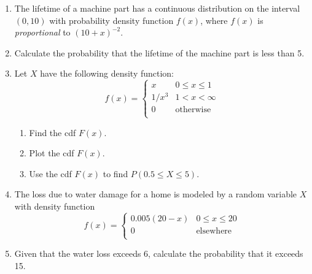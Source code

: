 \documentclass{article}
\begin{document}
\begin{enumerate}
    \item The lifetime of a machine part has a continuous distribution on the interval $(0,10)$ with probability density function $f(x)$, where $f(x)$ is \textit{proportional} to $(10 +x)^{-2}$.
    \item[] Calculate the probability that the lifetime of the machine part is less than 5.\bigskip%
    
    \item Let $X$ have the following density function:%
    \[
    f(x) =
        \left\{
        \begin{array}{ll}
             x & 0 \le x \le 1\\
             1/x^3 & 1 < x < \infty\\
             0 & \text{otherwise}\\
        \end{array}
        \right.
    \]
    \begin{enumerate}
        \item Find the cdf $F(x)$.
        \item Plot the cdf $F(x)$.
        \item Use the cdf $F(x)$ to find $P(0.5 \le X \le 5)$.    
    \end{enumerate}\bigskip
    
    \item The loss due to water damage for a home is modeled by a random variable $X$ with density function
    \[
    f(x) =
        \left\{
        \begin{array}{ll}
             0.005(20 - x) & 0 \le x \le 20\\
             0 & \text{elsewhere}\\
        \end{array}
        \right.
    \]
    \item[] Given that the water loss exceeds 6, calculate the probability that it exceeds 15.\bigskip%

\end{enumerate}

\newpage
\end{document}
